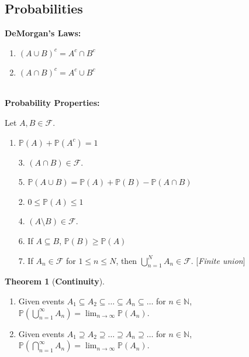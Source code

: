 \documentclass[12pt]{extarticle}
\newcommand{\pstart}[0]{\noindent}
\theoremstyle{definition}
\newtheorem*{theorem}{Theorem}
\theoremstyle{remark}
\begin{document}
\subsection{Probabilities}
\pstart
\textbf{DeMorgan's Laws:}
\begin{enumerate}
    \item $(A\cup B)^c=A^c\cap B^c$
    \item $(A\cap B)^c=A^c\cup B^c$
\end{enumerate}

~\\
\pstart
\textbf{Probability Properties:}

\vspace{8pt}\pstart
Let $A,B\in\mathcal{F}$.

\vspace{5pt}\pstart
\begin{minipage}[t]{0.5\textwidth}
    \begin{enumerate}
        \item $\mathbb{P}(A)+\mathbb{P}(A^c)=1$
        \item[3.] $(A\cap B)\in\mathcal{F}$.
        \item[5.] $\mathbb{P}(A\cup 
B)=\mathbb{P}(A)+\mathbb{P}(B)-\mathbb{P}(A\cap B)$
    \end{enumerate}
\end{minipage}
\begin{minipage}[t]{0.5\textwidth}
    \begin{enumerate}
        \item[2.] $0\leq \mathbb{P}(A)\leq 1$
        \item[4.] $(A\setminus B)\in\mathcal{F}$.
        \item[6.] If $A\subseteq B$, $\mathbb{P}(B)\geq \mathbb{P}(A)$
    \end{enumerate}
\end{minipage}

\begin{enumerate}
    \item[7.] If $A_n\in\mathcal{F}$ for $1\leq n\leq N$, then 
$\bigcup_{n=1}^NA_n\in\mathcal{F}$. [\textit{Finite union}]
\end{enumerate}

\begin{theorem}[\textbf{Continuity}]~

    \begin{enumerate}
        \item Given events $A_1\subseteq A_2\subseteq\hdots\subseteq 
A_n\subseteq\hdots$ for $n\in\mathbb{N}$, 
\ul{$\mathbb{P}(\bigcup_{n=1}^\infty 
A_n)=\lim_{n\to\infty}\mathbb{P}(A_n)$}.
        \item Given events $A_1\supseteq A_2\supseteq\hdots\supseteq 
A_n\supseteq\hdots$ for $n\in\mathbb{N}$, 
\ul{$\mathbb{P}(\bigcap_{n=1}^\infty 
A_n)=\lim_{n\to\infty}\mathbb{P}(A_n)$}.
    \end{enumerate}
\end{theorem}
\end{document}
